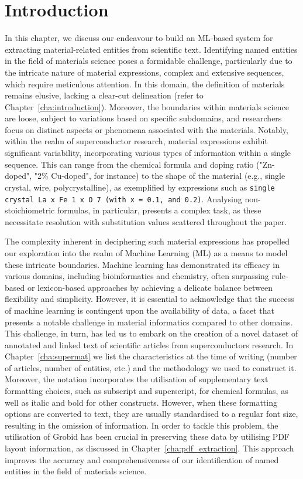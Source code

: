 \section{Introduction}
In this chapter, we discuss our endeavour to build an ML-based system for extracting material-related entities from scientific text. 
Identifying named entities in the field of materials science poses a formidable challenge, particularly due to the intricate nature of material expressions, complex and extensive sequences, which require meticulous attention. 
In this domain, the definition of materials remains elusive, lacking a clear-cut delineation (refer to Chapter~\ref{cha:introduction}). Moreover, the boundaries within materials science are loose, subject to variations based on specific subdomains, and researchers focus on distinct aspects or phenomena associated with the materials.
Notably, within the realm of superconductor research, material expressions exhibit significant variability, incorporating various types of information within a single sequence. This can range from the chemical formula and doping ratio ("Zn-doped", "2\% Cu-doped", for instance) to the shape of the material (e.g., single crystal, wire, polycrystalline), as exemplified by expressions such as \texttt{single crystal La x Fe 1 x O 7 (with x = 0.1, and 0.2)}. Analysing non-stoichiometric formulas, in particular, presents a complex task, as these necessitate resolution with substitution values scattered throughout the paper.

The complexity inherent in deciphering such material expressions has propelled our exploration into the realm of Machine Learning (ML) as a means to model these intricate boundaries. Machine learning has demonstrated its efficacy in various domains, including bioinformatics and chemistry, often surpassing rule-based or lexicon-based approaches by achieving a delicate balance between flexibility and simplicity. However, it is essential to acknowledge that the success of machine learning is contingent upon the availability of data, a facet that presents a notable challenge in material informatics compared to other domains. This challenge, in turn, has led us to embark on the creation of a novel dataset of annotated and linked text of scientific articles from superconductors research. In Chapter~\ref{cha:supermat} we list the characteristics at the time of writing (number of articles, number of entities, etc.) and the methodology we used to construct it. 
Moreover, the notation incorporates the utilisation of supplementary text formatting choices, such as subscript and superscript, for chemical formulas, as well as italic and bold for other constructs. However, when these formatting options are converted to text, they are usually standardised to a regular font size, resulting in the omission of information.
In order to tackle this problem, the utilisation of Grobid has been crucial in preserving these data by utilising PDF layout information, as discussed in Chapter~\ref{cha:pdf_extraction}. This approach improves the accuracy and comprehensiveness of our identification of named entities in the field of materials science.

